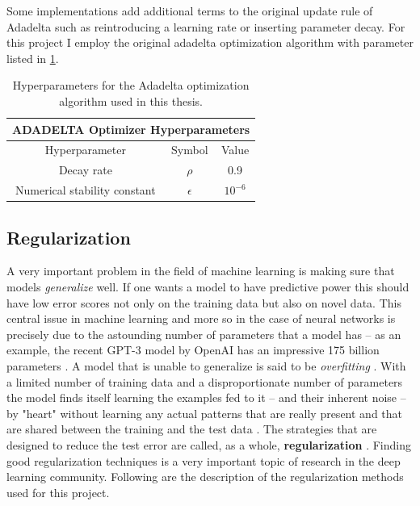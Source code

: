 Some implementations add additional terms to the original update rule of Adadelta such as reintroducing a learning rate or inserting parameter decay. For this project I employ the original adadelta optimization algorithm with parameter listed in \cref{tab:optimparam}.

\begin{table}[h!]
    \centering
    \begin{tabular}{cc|c}
    \hline
    \multicolumn{3}{c}{ADADELTA Optimizer Hyperparameters} \\
    \hline
         Hyperparameter & Symbol & Value \\
    \hline
    \hline
         Decay rate & $\rho$ & 0.9 \\
         Numerical stability constant & $\epsilon$ & $10^{-6}$ \\
    \hline
    \end{tabular}
    \caption{Hyperparameters for the Adadelta optimization algorithm used in this thesis.}
    \label{tab:optimparam}
\end{table}

\subsection{Regularization} \label{sec:regularization}
A very important problem in the field of machine learning is making sure that models \textit{generalize} well. If one wants a model to have predictive power this should have low error scores not only on the training data but also on novel data. This central issue in machine learning and more so in the case of neural networks is precisely due to the astounding number of parameters that a model has -- as an example, the recent GPT-3 model by OpenAI has an impressive 175 billion parameters \citep{Brown2020LanguageLearners}. A model that is unable to generalize is said to be \textit{overfitting} \citep{Bishop2006PatternLearning}. With a limited number of training data and a disproportionate number of parameters the model finds itself learning the examples fed to it -- and their inherent noise -- by "heart" without learning any actual patterns that are really present and that are shared between the training and the test data \citep{Goodfellow2016}. The strategies that are designed to reduce the test error are called, as a whole, \textbf{regularization} \citep{Goodfellow2016,Bishop2006PatternLearning}. Finding good regularization techniques is a very important topic of research in the deep learning community. Following are the description of the regularization methods used for this project.

